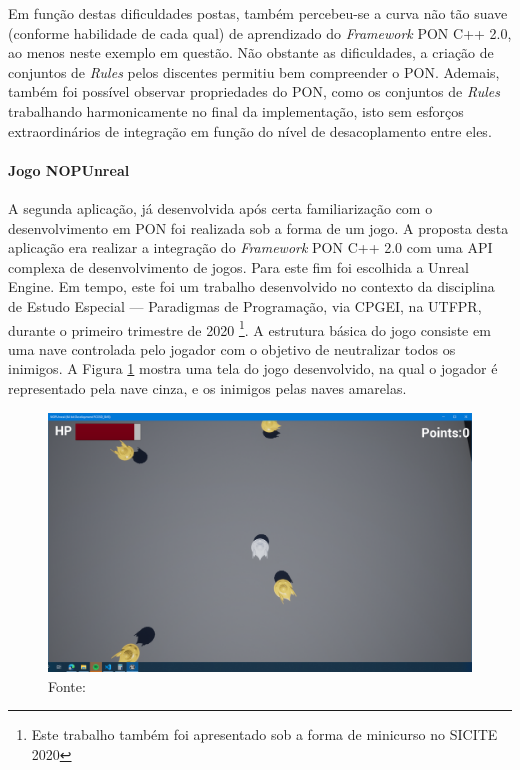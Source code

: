 Em função destas dificuldades postas, também percebeu-se a curva não tão suave
(conforme habilidade de cada qual) de aprendizado do \textit{Framework} PON C++
2.0, ao menos neste exemplo em questão. Não obstante as dificuldades, a criação
de conjuntos de \textit{Rules} pelos discentes permitiu bem compreender o PON.
Ademais, também foi possível observar propriedades do PON, como os conjuntos de
\textit{Rules} trabalhando harmonicamente no final da implementação, isto sem
esforços extraordinários de integração em função do nível de desacoplamento
entre eles.

\paragraph{Jogo NOPUnreal}\label{sec:nopunreal}

A segunda aplicação, já desenvolvida após certa familiarização com o
desenvolvimento em PON foi realizada sob a forma de um jogo. A proposta desta
aplicação era realizar a integração do \textit{Framework} PON C++ 2.0 com uma
API complexa de desenvolvimento de jogos. Para este fim foi escolhida a Unreal
Engine. Em tempo, este foi um trabalho desenvolvido no contexto da disciplina de
Estudo Especial — Paradigmas de Programação, via CPGEI, na UTFPR, durante o
primeiro trimestre de 2020 \cite{neves_2020}\footnote{Este trabalho também foi
apresentado sob a forma de minicurso no SICITE 2020}. A estrutura básica do jogo
consiste em uma nave controlada pelo jogador com o objetivo de neutralizar todos
os inimigos. A Figura \ref{fig:jogo_fw2} mostra uma tela do jogo desenvolvido,
na qual o jogador é representado pela nave cinza, e os inimigos pelas naves
amarelas.

\begin{figure}[!htb]
  \centering
  \includegraphics[width=\textwidth]{../figures/game.png}
  \smallskip
  \caption{\textit{Screenshot} do jogo desenvolvido} \caption*{Fonte:
      }
  \label{fig:jogo_fw2}
\end{figure}

